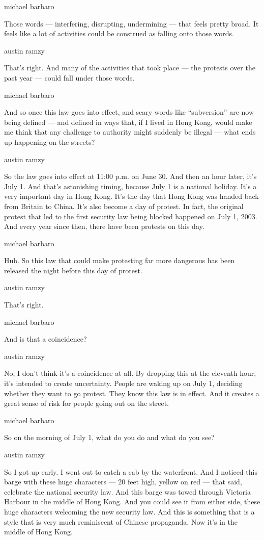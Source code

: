 michael barbaro

Those words --- interfering, disrupting, undermining --- that feels
pretty broad. It feels like a lot of activities could be construed as
falling onto those words.

austin ramzy

That's right. And many of the activities that took place --- the
protests over the past year --- could fall under those words.

michael barbaro

And so once this law goes into effect, and scary words like
``subversion'' are now being defined --- and defined in ways that, if I
lived in Hong Kong, would make me think that any challenge to authority
might suddenly be illegal --- what ends up happening on the streets?

austin ramzy

So the law goes into effect at 11:00 p.m. on June 30. And then an hour
later, it's July 1. And that's astonishing timing, because July 1 is a
national holiday. It's a very important day in Hong Kong. It's the day
that Hong Kong was handed back from Britain to China. It's also become a
day of protest. In fact, the original protest that led to the first
security law being blocked happened on July 1, 2003. And every year
since then, there have been protests on this day.

michael barbaro

Huh. So this law that could make protesting far more dangerous has been
released the night before this day of protest.

austin ramzy

That's right.

michael barbaro

And is that a coincidence?

austin ramzy

No, I don't think it's a coincidence at all. By dropping this at the
eleventh hour, it's intended to create uncertainty. People are waking up
on July 1, deciding whether they want to go protest. They know this law
is in effect. And it creates a great sense of risk for people going out
on the street.

michael barbaro

So on the morning of July 1, what do you do and what do you see?

austin ramzy

So I got up early. I went out to catch a cab by the waterfront. And I
noticed this barge with these huge characters --- 20 feet high, yellow
on red --- that said, celebrate the national security law. And this
barge was towed through Victoria Harbour in the middle of Hong Kong. And
you could see it from either side, these huge characters welcoming the
new security law. And this is something that is a style that is very
much reminiscent of Chinese propaganda. Now it's in the middle of Hong
Kong.

